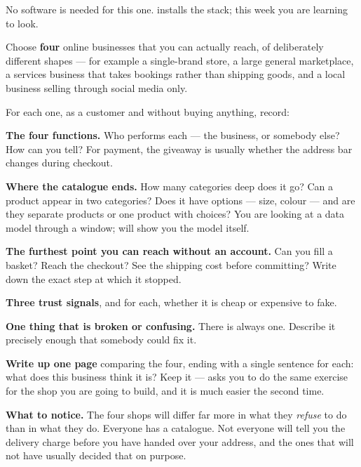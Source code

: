 \begin{lab}
No software is needed for this one.  installs the stack; this week
you are learning to look.

\smallskip
Choose \textbf{four} online businesses that you can actually reach, of
deliberately different shapes --- for example a single-brand store, a large
general marketplace, a services business that takes bookings rather than
shipping goods, and a local business selling through social media only.

\smallskip
For each one, as a customer and without buying anything, record:

\begin{tightnum}
  \item \textbf{The four functions.} Who performs each --- the business, or
        somebody else? How can you tell? For payment, the giveaway is usually
        whether the address bar changes during checkout.
  \item \textbf{Where the catalogue ends.} How many categories deep does it go?
        Can a product appear in two categories? Does it have options --- size,
        colour --- and are they separate products or one product with choices?
        You are looking at a data model through a window;  will
        show you the model itself.
  \item \textbf{The furthest point you can reach without an account.} Can you
        fill a basket? Reach the checkout? See the shipping cost before
        committing? Write down the exact step at which it stopped.
  \item \textbf{Three trust signals}, and for each, whether it is cheap or
        expensive to fake.
  \item \textbf{One thing that is broken or confusing.} There is always one.
        Describe it precisely enough that somebody could fix it.
\end{tightnum}

\smallskip
\textbf{Write up one page} comparing the four, ending with a single sentence
for each: what does this business think it is? Keep it --- 
asks you to do the same exercise for the shop you are going to build, and it is
much easier the second time.

\smallskip
\textbf{What to notice.} The four shops will differ far more in what they
\emph{refuse} to do than in what they do. Everyone has a catalogue. Not everyone
will tell you the delivery charge before you have handed over your address, and
the ones that will not have usually decided that on purpose.
\end{lab}

